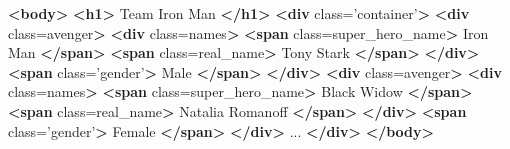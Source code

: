 \documentclass[sigconf,10pt]{acmart}
\newenvironment{Shaded}{}{}
\newcommand{\KeywordTok}[1]{\textcolor[rgb]{0.00,0.44,0.13}{\textbf{#1}}}
\newcommand{\NormalTok}[1]{#1}
\newcommand{\OtherTok}[1]{\textcolor[rgb]{0.00,0.44,0.13}{#1}}
\newcommand{\StringTok}[1]{\textcolor[rgb]{0.25,0.44,0.63}{#1}}
\begin{document}
\begin{Shaded}
\begin{Highlighting}[]
\KeywordTok{\textless{}body\textgreater{}}
    \KeywordTok{\textless{}h1\textgreater{}}\NormalTok{ Team Iron Man }\KeywordTok{\textless{}/h1\textgreater{}}
    \KeywordTok{\textless{}div}\OtherTok{ class=}\StringTok{’container’}\KeywordTok{\textgreater{}}
        \KeywordTok{\textless{}div}\OtherTok{ class=}\StringTok{\textquotesingle{}avenger\textquotesingle{}}\KeywordTok{\textgreater{}}
            \KeywordTok{\textless{}div}\OtherTok{ class=}\StringTok{\textquotesingle{}names\textquotesingle{}}\KeywordTok{\textgreater{}}
                \KeywordTok{\textless{}span}\OtherTok{ class=}\StringTok{\textquotesingle{}super\_hero\_name\textquotesingle{}}\KeywordTok{\textgreater{}}\NormalTok{ Iron Man }\KeywordTok{\textless{}/span\textgreater{}}
                \KeywordTok{\textless{}span}\OtherTok{ class=}\StringTok{\textquotesingle{}real\_name\textquotesingle{}}\KeywordTok{\textgreater{}}\NormalTok{ Tony Stark }\KeywordTok{\textless{}/span\textgreater{}}
            \KeywordTok{\textless{}/div\textgreater{}}
           \KeywordTok{\textless{}span}\OtherTok{ class=}\StringTok{’gender’}\KeywordTok{\textgreater{}}\NormalTok{ Male }\KeywordTok{\textless{}/span\textgreater{}}
        \KeywordTok{\textless{}/div\textgreater{}}
        \KeywordTok{\textless{}div}\OtherTok{ class=}\StringTok{\textquotesingle{}avenger\textquotesingle{}}\KeywordTok{\textgreater{}}
            \KeywordTok{\textless{}div}\OtherTok{ class=}\StringTok{\textquotesingle{}names\textquotesingle{}}\KeywordTok{\textgreater{}}
                \KeywordTok{\textless{}span}\OtherTok{ class=}\StringTok{\textquotesingle{}super\_hero\_name\textquotesingle{}}\KeywordTok{\textgreater{}}\NormalTok{  Black Widow }\KeywordTok{\textless{}/span\textgreater{}}
                \KeywordTok{\textless{}span}\OtherTok{ class=}\StringTok{\textquotesingle{}real\_name\textquotesingle{}}\KeywordTok{\textgreater{}}\NormalTok{ Natalia Romanoff }\KeywordTok{\textless{}/span\textgreater{}}
            \KeywordTok{\textless{}/div\textgreater{}}
            \KeywordTok{\textless{}span}\OtherTok{ class=}\StringTok{’gender’}\KeywordTok{\textgreater{}}\NormalTok{ Female }\KeywordTok{\textless{}/span\textgreater{}}
        \KeywordTok{\textless{}/div\textgreater{}}
\NormalTok{        ...}
    \KeywordTok{\textless{}/div\textgreater{}}
\KeywordTok{\textless{}/body\textgreater{}}
\end{Highlighting}
\end{Shaded}
\end{document}
